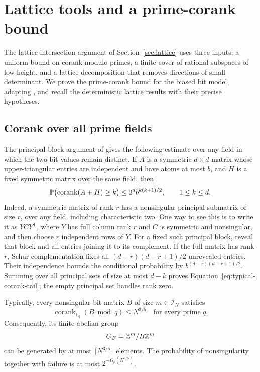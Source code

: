 \section{Lattice tools and a prime-corank bound}\label{sec:typical}

The lattice-intersection argument of Section~\ref{sec:lattice} uses
three inputs: a uniform bound on corank modulo primes, a finite cover
of rational subspaces of low height, and a lattice decomposition that
removes directions of small determinant. We prove the prime-corank
bound for the biased bit model, adapting
\cite[Proposition~5.3]{SymmetricRate}, and recall the deterministic
lattice results with their precise hypotheses.

\subsection{Corank over all prime fields}

The principal-block argument of
\cite[Lemmas~2.2 and~2.3]{SymmetricRate} gives the following estimate over
any field in which the two bit values remain distinct. If \(A\) is a
symmetric \(d\times d\) matrix
whose upper-triangular entries are independent and have atoms at most
\(b\), and \(H\) is a fixed symmetric matrix over the same field, then
\begin{equation}\label{eq:typical-corank-tail}
 \mathbb P\bigl(\operatorname{corank}(A+H)\ge k\bigr)
 \le 2^d b^{k(k+1)/2},\qquad 1\le k\le d.
\end{equation}
Indeed, a symmetric matrix of rank \(r\) has a nonsingular principal
submatrix of size \(r\), over any field, including characteristic two.
One way to see this is to write it as \(Y C Y^{\mathsf T}\), where
\(Y\) has full column rank \(r\) and \(C\) is symmetric and
nonsingular, and then choose \(r\) independent rows of \(Y\).
For a fixed such principal block, reveal that block and all entries
joining it to its complement. If the full matrix has rank \(r\),
Schur complementation fixes all
\((d-r)(d-r+1)/2\) unrevealed entries. Their independence bounds the
conditional probability by \(b^{(d-r)(d-r+1)/2}\). Summing over all
principal sets of size at most \(d-k\) proves
Equation~\eqref{eq:typical-corank-tail}; the empty principal set handles
rank zero.

\begin{lemma}\label{lem:prime-corank}
Typically, every nonsingular bit matrix \(B\) of size \(m\in\mathcal I_N\)
satisfies
\[
 \operatorname{corank}_{\mathbb F_q}(B\bmod q)\le N^{3/5}
 \quad\text{for every prime }q.
\]
Consequently, its finite abelian group
\[
 G_B=\mathbb Z^m/B\mathbb Z^m
\]
can be generated by at most \(\lceil N^{3/5}\rceil\) elements.
The probability of nonsingularity together with failure is at most
\(2^{-\Omega_p(N^{6/5})}\).
\end{lemma}

